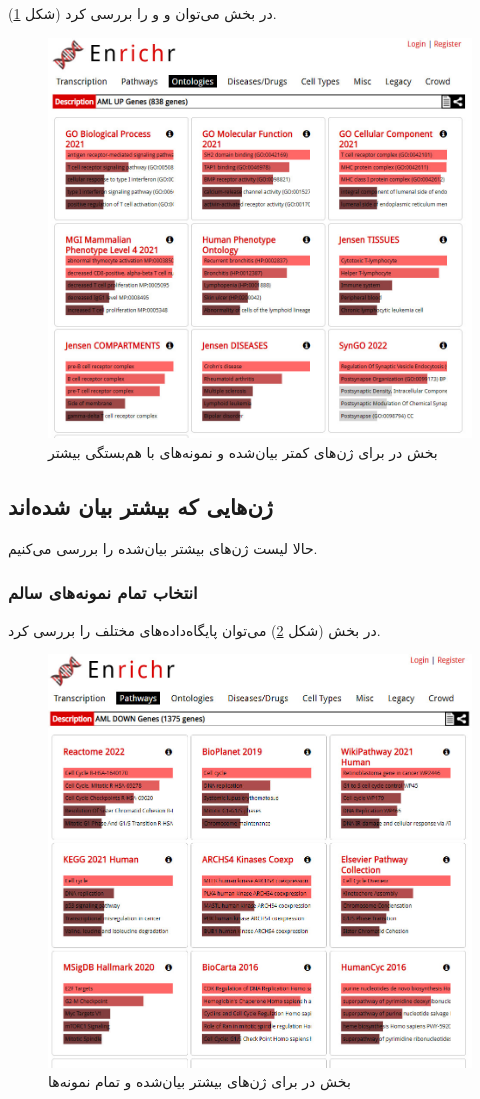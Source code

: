 \documentclass{article}
\begin{document}
در بخش  می‌توان  و  و  را بررسی کرد (شکل \ref{fig:enrichr-ontology-2}).
\begin{figure}[h!]
	\centering
	\includegraphics[width=0.5\columnwidth]{figs/enrichr-ontologies-2.jpg}
	\caption{بخش  در  برای ژن‌های کمتر بیان‌شده و نمونه‌های با هم‌بستگی بیشتر}
	\label{fig:enrichr-ontology-2}
\end{figure}

\subsection{ژن‌هایی که بیشتر بیان شده‌اند}
حالا لیست ژن‌های بیشتر بیان‌شده را بررسی می‌کنیم.

\subsubsection{انتخاب تمام نمونه‌های سالم}
در بخش  (شکل \ref{fig:enrichr-pathways-d}) می‌توان پایگاه‌داده‌های  مختلف را بررسی کرد.
\begin{figure}[h!]
	\centering
	\includegraphics[width=0.5\columnwidth]{figs/enrichr-pathways-d.jpg}
	\caption{بخش  در  برای ژن‌های بیشتر بیان‌شده و تمام نمونه‌ها}
	\label{fig:enrichr-pathways-d}
\end{figure}
\end{document}
